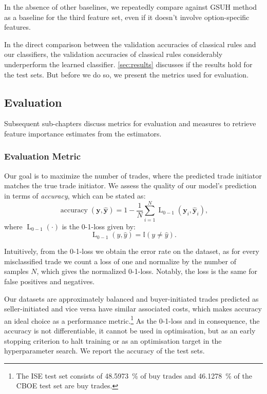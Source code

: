 In the absence of other baselines, we repeatedly compare against \gls{GSUH} method as a baseline for the third feature set, even if it doesn't involve option-specific features.

In the direct comparison between the validation accuracies of classical rules and our classifiers, the validation accuracies of classical rules considerably underperform the learned classifier. \cref{sec:results} discusses if the results hold for the test sets. But before we do so, we present the metrics used
for evaluation.

\subsection{Evaluation}\label{sec:evaluation}

Subsequent sub-chapters discuss metrics for evaluation and measures to retrieve feature importance estimates from the estimators.

\subsubsection{Evaluation Metric}\label{sec:evaluation-metric}

Our goal is to maximize the number of trades, where the predicted trade initiator matches the true trade initiator. We assess the quality of our model’s prediction in terms of \emph{accuracy}, which can be stated as:
\begin{equation}
    \operatorname{accuracy}(\mathbf{y}, \widehat{\mathbf{y}}) = 1 - \frac{1}{N}\sum_{i=1}^{N} \operatorname{L}_{\mathrm{0-1}}(\mathbf{y}_i, \widehat{\mathbf{y}}_i),
\end{equation}
where $\operatorname{L}_{\mathrm{0-1}}(\cdot)$ is the 0-1-loss given by:
\begin{equation}
    \operatorname{L}_{\mathrm{0-1}}(y, \hat{y}) = \mathbb{I}\left(y\neq \hat{y}\right).
\end{equation}

Intuitively, from the 0-1-loss we obtain the error rate on the dataset, as for every misclassified trade we count a loss of one and normalize by the number of samples $N$, which gives the normalized 0-1-loss. Notably, the loss is the same for false positives and negatives.

Our datasets are approximately balanced and buyer-initiated trades predicted as seller-initiated and vice versa have similar associated costs, which makes accuracy an ideal choice as a performance metric.\footnote{The \gls{ISE} test set consists of \SI{48.5973}{\percent} of buy trades and \SI{46.1278}{\percent} of the \gls{CBOE} test set are buy trades.} As the 0-1-loss and in consequence, the accuracy is not differentiable, it cannot be used in optimisation, but as an early stopping criterion to halt training or as an optimisation target in the hyperparameter search. We report the accuracy of the test sets.

